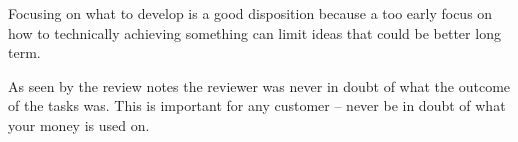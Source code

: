 \documentclass[Main]{subfiles}
\begin{document}
Focusing on what to develop is a good disposition because a too early focus on how to technically achieving something can limit ideas that could be better long term.

As seen by the review notes the reviewer was never in doubt of what the outcome of the tasks was.
This is important for any customer -- never be in doubt of what your money is used on.
\end{document}
